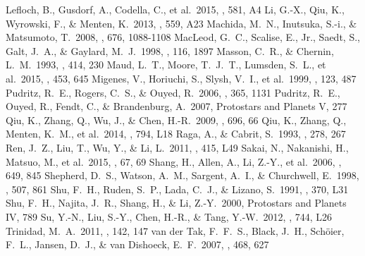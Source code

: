 \documentclass[twocolumn]{aastex62}
\begin{document}
\begin{thebibliography}{}
 Lefloch, B., Gusdorf, A., Codella, C., et al.\ 2015, \aap, 581, A4
 Li, G.-X., Qiu, K., Wyrowski, F., \& Menten, K.\ 2013, \aap, 559, A23 
 Machida, M.~N., Inutsuka, S.-i., \& Matsumoto, T.\ 2008, \apj, 676, 1088-1108  
 MacLeod, G.~C., Scalise, E., Jr., Saedt, S., Galt, J.~A., \& Gaylard, M.~J.\ 1998, \aj, 116, 1897 
 Masson, C.~R., \& Chernin, L.~M.\ 1993, \apj, 414, 230 
 Maud, L.~T., Moore, T.~J.~T., Lumsden, S.~L., et al.\ 2015, \mnras, 453, 645
 Migenes, V., Horiuchi, S., Slysh, V.~I., et al.\ 1999, \apjs, 123, 487
 Pudritz, R.~E., Rogers, C.~S., \& Ouyed, R.\ 2006, \mnras, 365, 1131 
 Pudritz, R.~E., Ouyed, R., Fendt, C., \& Brandenburg, A.\ 2007, Protostars and Planets V, 277
 Qiu, K., Zhang, Q., Wu, J., \& Chen, H.-R.\ 2009, \apj, 696, 66
 Qiu, K., Zhang, Q., Menten, K.~M., et al.\ 2014, \apjl, 794, L18 
 Raga, A., \& Cabrit, S.\ 1993, \aap, 278, 267 
 Ren, J.~Z., Liu, T., Wu, Y., \& Li, L.\ 2011, \mnras, 415, L49 
 Sakai, N., Nakanishi, H., Matsuo, M., et al.\ 2015, \pasj, 67, 69
 Shang, H., Allen, A., Li, Z.-Y., et al.\ 2006, \apj, 649, 845 
 Shepherd, D.~S., Watson, A.~M., Sargent, A.~I., \& Churchwell, E.\ 1998, \apj, 507, 861 
 Shu, F.~H., Ruden, S.~P., Lada, C.~J., \& Lizano, S.\ 1991, \apjl, 370, L31
 Shu, F.~H., Najita, J.~R., Shang, H., \& Li, Z.-Y.\ 2000, Protostars and Planets IV, 789
 Su, Y.-N., Liu, S.-Y., Chen, H.-R., \& Tang, Y.-W.\ 2012, \apjl, 744, L26 
 Trinidad, M.~A.\ 2011, \aj, 142, 147 
 van der Tak, F.~F.~S., Black, J.~H., Sch{\"o}ier, F.~L., Jansen, D.~J., \& van Dishoeck, E.~F.\ 2007, \aap, 468, 627

\end{thebibliography}
\end{document}
